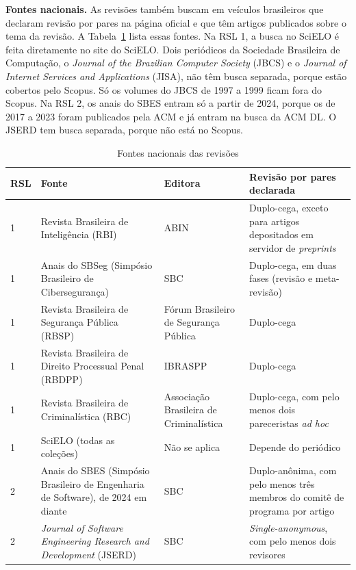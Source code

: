 \textbf{Fontes nacionais.} As revisões também buscam em veículos brasileiros
que declaram revisão por pares na página oficial e que têm artigos publicados
sobre o tema da revisão. A Tabela~\ref{tab:fontes-nacionais} lista essas
fontes. Na RSL 1, a busca no SciELO é feita diretamente no site do SciELO.
Dois periódicos da Sociedade Brasileira de Computação, o \textit{Journal of
the Brazilian Computer Society} (JBCS) e o \textit{Journal of Internet Services
and Applications} (JISA), não têm busca separada, porque estão cobertos pelo
Scopus. Só os volumes do JBCS de 1997 a 1999 ficam fora do Scopus. Na RSL 2, os anais do SBES entram só a partir de 2024, porque os de
2017 a 2023 foram publicados pela ACM e já entram na busca da ACM DL. O JSERD
tem busca separada, porque não está no Scopus.

\begin{table}[htbp]
	\centering
	\caption{Fontes nacionais das revisões}
	\label{tab:fontes-nacionais}
	\small
	\begin{tabular}{p{1.1cm}>{\raggedright\arraybackslash}p{5.6cm}>{\raggedright\arraybackslash}p{2.8cm}>{\raggedright\arraybackslash}p{4.6cm}}
		\hline
		\textbf{RSL} & \textbf{Fonte} & \textbf{Editora} &
		\textbf{Revisão por pares declarada} \\
		\hline
		1 & Revista Brasileira de Inteligência (RBI) & ABIN &
		Duplo-cega, exceto para artigos depositados em servidor de
		\textit{preprints} \\
		1 & Anais do SBSeg (Simpósio Brasileiro de Cibersegurança) & SBC &
		Duplo-cega, em duas fases (revisão e meta-revisão) \\
		1 & Revista Brasileira de Segurança Pública (RBSP) & Fórum Brasileiro
		de Segurança Pública & Duplo-cega \\
		1 & Revista Brasileira de Direito Processual Penal (RBDPP) & IBRASPP &
		Duplo-cega \\
		1 & Revista Brasileira de Criminalística (RBC) & Associação Brasileira
		de Criminalística & Duplo-cega, com pelo menos dois pareceristas
		\textit{ad hoc} \\
		1 & SciELO (todas as coleções) & Não se aplica & Depende do periódico \\
		\hline
		2 & Anais do SBES (Simpósio Brasileiro de Engenharia de Software),
		de 2024 em diante & SBC & Duplo-anônima, com pelo menos três membros
		do comitê de programa por artigo \\
		2 & \textit{Journal of Software Engineering Research and Development}
		(JSERD) & SBC & \textit{Single-anonymous}, com pelo menos dois
		revisores \\
		\hline
	\end{tabular}
\end{table}


